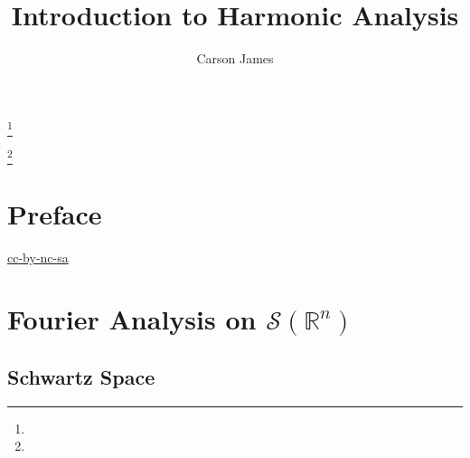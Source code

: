 \documentclass{book}
\theoremstyle{definition}
\newcommand{\R}{\mathbb{R}}
\newcommand{\MS}{\mathcal{S}}
\DeclareMathOperator*{\0}{\mbf{0}}
\DeclareMathOperator*{\1}{\mbf{1}}
\begin{document}
	
	\frontmatter
	
	\title{Introduction to Harmonic Analysis}
	
	
	\author{Carson James}
	\thanks{}
	
	\author{}
	\thanks{}
	
	\date{}
	
	\maketitle
	
	
	\setcounter{page}{4}
	
	\tableofcontents
	\printunsrtglossary[type=symbols,style=long,title={Notation}]
	
	
	\mainmatter
	
	\chapter*{Preface}
	
	\begin{flushleft}
		\href{https://creativecommons.org/licenses/by-nc-sa/4.0/legalcode.txt}{cc-by-nc-sa}
	\end{flushleft}
	
	\newpage
	
	\newpage
	\chapter{Fourier Analysis on $\MS(\R^n)$}	
	
	\section{Schwartz Space}
	
\end{document}
